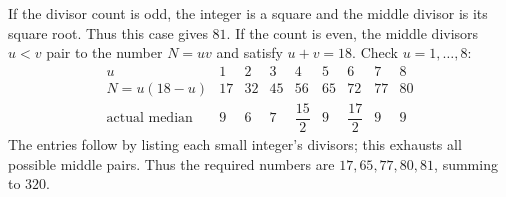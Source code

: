 If the divisor count is odd, the integer is a square and the middle divisor is its square root. Thus this case gives $81$.
If the count is even, the middle divisors $u<v$ pair to the number $N=uv$ and satisfy $u+v=18$. Check $u=1,\ldots,8$:
\[\begin{array}{c|rrrrrrrr}u&1&2&3&4&5&6&7&8\\N=u(18-u)&17&32&45&56&65&72&77&80\\\text{actual median}&9&6&7&\dfrac{15}{2}&9&\dfrac{17}{2}&9&9\end{array}\]
The entries follow by listing each small integer's divisors; this exhausts all possible middle pairs. Thus the required numbers are $17,65,77,80,81$, summing to $\boxed{320}$.
